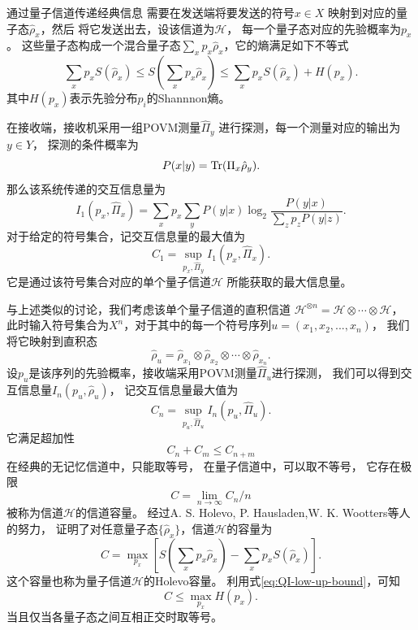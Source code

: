 通过量子信道传递经典信息
需要在发送端将要发送的符号$x \in X$
映射到对应的量子态$\hat{\rho}_x$，然后
将它发送出去，设该信道为$\mathcal{H}$，
每一个量子态对应的先验概率为$p_x$。
这些量子态构成一个混合量子态$\sum_x p_x\hat{\rho}_x$，它的熵满足如下不等式\cite{nielsen2005qcqi}
\begin{equation}
\sum_x p_x S(\hat{\rho}_x) \le S(\sum_x p_x\hat{\rho}_x) \le \sum_x p_x S(\hat{\rho}_x) + H(p_x).
\label{eq:QI-low-up-bound}
\end{equation}
其中$H(p_x)$表示先验分布$p_i$的Shannnon熵。

在接收端，接收机采用一组POVM测量$\hat{\Pi}_y$
进行探测，每一个测量对应的输出为$y \in Y$，
探测的条件概率为
\begin{equation}
P(x|y) = \Tr(\Pi_x \hat{\rho}_y ).
\end{equation}
那么该系统传递的交互信息量为
\begin{equation}
I_1(p_x, \hat{\Pi}_x) = \sum_x p_x \sum_y P(y|x) \log_2  \frac{P(y|x)}{\sum_z p_z P(y|z)}.
\end{equation}
对于给定的符号集合，记交互信息量的最大值为
\begin{equation}
C_1= \sup_{p_x,\hat{\Pi}_y} I_1(p_x, \hat{\Pi}_x).
\end{equation}
它是通过该符号集合对应的单个量子信道$\mathcal{H}$
所能获取的最大信息量。


与上述类似的讨论，我们考虑该单个量子信道的直积信道
$\mathcal{H}^{\otimes n}=\mathcal{H}\otimes\cdots \otimes \mathcal{H}$，
此时输入符号集合为$X^n$，对于其中的每一个符号序列$u = (x_1, x_2, ..., x_n)$，
我们将它映射到直积态
\begin{equation}
\hat{\rho}_u = \hat{\rho}_{x_1}\otimes \hat{\rho}_{x_2}\otimes \cdots \otimes \hat{\rho}_{x_n}.
\end{equation}
设$p_u$是该序列的先验概率，接收端采用POVM测量$\hat{\Pi}_u$进行探测，
我们可以得到交互信息量$I_n(p_u, \hat{\rho}_u)$，
记交互信息量最大值为
\begin{equation}
C_n= \sup_{p_u,\hat{\Pi}_u} I_n(p_u, \hat{\Pi}_u).
\end{equation}
它满足超加性
\begin{equation}
C_n + C_m \le C_{n+m}
\end{equation}
在经典的无记忆信道中，只能取等号，
在量子信道中，可以取不等号，
它存在极限
\begin{equation}
C = \lim_{n \rightarrow \infty} C_n / n
\end{equation}
被称为信道$\mathcal{H}$的信道容量。
经过A. S. Holevo, P. Hausladen,W. K. Wootters等人的努力，
证明了对任意量子态$\{\hat{\rho}_x\}$，信道$\mathcal{H}$的容量为\cite{holevo1973bounds,hausladen1996classical, holevo1996capacity}
\begin{equation}
C = \max_{p_x}\left[ S(\sum_x p_x \hat{\rho}_x) - \sum_x p_x S( \hat{\rho}_x) \right].
\end{equation}
这个容量也称为量子信道$\mathcal{H}$的Holevo容量。
利用式\ref{eq:QI-low-up-bound}，可知
\begin{equation}
C \le \max_{p_x}H(p_x).
\end{equation}
当且仅当各量子态之间互相正交时取等号。

